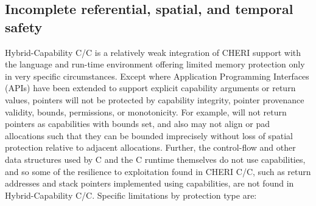\documentclass[12pt,twoside,openright,a4paper]{article}
\newcommand{\ccode}[1]{{\small\ttfamily{#1}}}
\newcommand{\cfunc}[1]{{\ccode{#1()}}}
\newcommand*{\cpp}{\texorpdfstring{C\textsmaller[2]{\protect\nolinebreak[4]\hspace{-.05em}\raisebox{.45ex}{\textbf{++}}}}{C++}}
\newcommand*{\COrCpp}{C/\cpp{}}
\newcommand*{\purecapCOrCpp}{CHERI \COrCpp{}}
\newcommand*{\hybridCOrCpp}{Hybrid-Capability \COrCpp{}}
\begin{document}
\subsection{Incomplete referential, spatial, and temporal safety}

\hybridCOrCpp{} is a relatively weak integration of CHERI support with
the language and run-time environment offering limited memory protection only
in very specific circumstances.
Except where Application Programming Interfaces (APIs) have been extended to
support explicit capability arguments or return values, pointers will not
be protected by capability integrity, pointer provenance validity, bounds,
permissions, or monotonicity.
For example, \cfunc{malloc} will not return pointers as capabilities with
bounds set, and also may not align or pad allocations such that they can be
bounded imprecisely without loss of spatial protection relative to adjacent
allocations.
Further, the control-flow and other data structures used by C and the C
runtime themselves do not use capabilities, and so some of the resilience to
exploitation found in \purecapCOrCpp{}, such as return addresses and stack
pointers implemented using capabilities, are not found in \hybridCOrCpp{}.
Specific limitations by protection type are:
\end{document}
